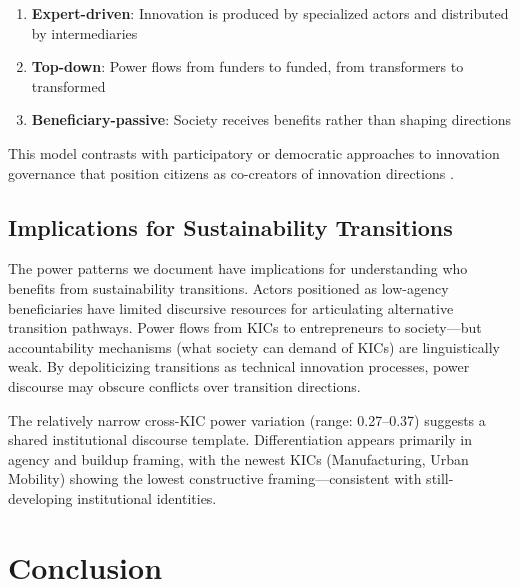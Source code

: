 \documentclass[../main.tex]{subfiles}
\begin{document}
\begin{enumerate}
    \item \textbf{Expert-driven}: Innovation is produced by specialized actors and distributed by intermediaries
    \item \textbf{Top-down}: Power flows from funders to funded, from transformers to transformed
    \item \textbf{Beneficiary-passive}: Society receives benefits rather than shaping directions
\end{enumerate}

This model contrasts with participatory or democratic approaches to innovation governance that position citizens as co-creators of innovation directions \cite{stilgoe2013developing}.

\subsection{Implications for Sustainability Transitions}

The power patterns we document have implications for understanding who benefits from sustainability transitions. Actors positioned as low-agency beneficiaries have limited discursive resources for articulating alternative transition pathways. Power flows from KICs to entrepreneurs to society---but accountability mechanisms (what society can demand of KICs) are linguistically weak. By depoliticizing transitions as technical innovation processes, power discourse may obscure conflicts over transition directions.

The relatively narrow cross-KIC power variation (range: 0.27--0.37) suggests a shared institutional discourse template. Differentiation appears primarily in agency and buildup framing, with the newest KICs (Manufacturing, Urban Mobility) showing the lowest constructive framing---consistent with still-developing institutional identities.

\section{Conclusion}
\end{document}
